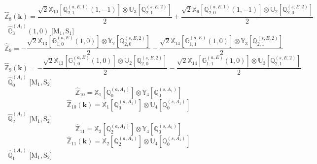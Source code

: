 \documentclass[fleqn,10pt,landscape]{article}
\begin{document}
\begin{itemize}
\begin{dmath*}
\end{dmath*}
\begin{dmath*}
\hat{\mathbb{Z}}_{8}(\bm{k})=\frac{\sqrt{2} \mathbb{X}_{10}[\mathbb{Q}_{2,1}^{(a,E,1)}(1,-1)] \otimes\mathbb{U}_{3}[\mathbb{Q}_{2,1}^{(s,E,2)}]}{2} + \frac{\sqrt{2} \mathbb{X}_{9}[\mathbb{Q}_{2,0}^{(a,E,1)}(1,-1)] \otimes\mathbb{U}_{2}[\mathbb{Q}_{2,0}^{(s,E,2)}]}{2}
\end{dmath*}
\vspace{4mm}
\noindent {} $\,\,\,\hat{\mathbb{G}}_{3}^{(A_{1})}(1,0)$ [M$_{1}$,\,S$_{1}$]
\begin{dmath*}
\hat{\mathbb{Z}}_{9}=- \frac{\sqrt{2} \mathbb{X}_{13}[\mathbb{G}_{1,0}^{(a,E)}(1,0)] \otimes\mathbb{Y}_{2}[\mathbb{Q}_{2,0}^{(s,E,2)}]}{2} - \frac{\sqrt{2} \mathbb{X}_{14}[\mathbb{G}_{1,1}^{(a,E)}(1,0)] \otimes\mathbb{Y}_{3}[\mathbb{Q}_{2,1}^{(s,E,2)}]}{2}
\end{dmath*}
\begin{dmath*}
\hat{\mathbb{Z}}_{9}(\bm{k})=- \frac{\sqrt{2} \mathbb{X}_{13}[\mathbb{G}_{1,0}^{(a,E)}(1,0)] \otimes\mathbb{U}_{2}[\mathbb{Q}_{2,0}^{(s,E,2)}]}{2} - \frac{\sqrt{2} \mathbb{X}_{14}[\mathbb{G}_{1,1}^{(a,E)}(1,0)] \otimes\mathbb{U}_{3}[\mathbb{Q}_{2,1}^{(s,E,2)}]}{2}
\end{dmath*}
\vspace{4mm}
\noindent {} $\,\,\,\hat{\mathbb{Q}}_{0}^{(A_{1})}$ [M$_{1}$,\,S$_{2}$]
\begin{dmath*}
\hat{\mathbb{Z}}_{10}=\mathbb{X}_{1}[\mathbb{Q}_{0}^{(a,A_{1})}] \otimes\mathbb{Y}_{4}[\mathbb{Q}_{0}^{(s,A_{1})}]
\end{dmath*}
\begin{dmath*}
\hat{\mathbb{Z}}_{10}(\bm{k})=\mathbb{X}_{1}[\mathbb{Q}_{0}^{(a,A_{1})}] \otimes\mathbb{U}_{4}[\mathbb{Q}_{0}^{(s,A_{1})}]
\end{dmath*}
\vspace{4mm}
\noindent {} $\,\,\,\hat{\mathbb{Q}}_{2}^{(A_{1})}$ [M$_{1}$,\,S$_{2}$]
\begin{dmath*}
\hat{\mathbb{Z}}_{11}=\mathbb{X}_{2}[\mathbb{Q}_{2}^{(a,A_{1})}] \otimes\mathbb{Y}_{4}[\mathbb{Q}_{0}^{(s,A_{1})}]
\end{dmath*}
\begin{dmath*}
\hat{\mathbb{Z}}_{11}(\bm{k})=\mathbb{X}_{2}[\mathbb{Q}_{2}^{(a,A_{1})}] \otimes\mathbb{U}_{4}[\mathbb{Q}_{0}^{(s,A_{1})}]
\end{dmath*}
\vspace{4mm}
\noindent {} $\,\,\,\hat{\mathbb{Q}}_{1}^{(A_{1})}$ [M$_{1}$,\,S$_{2}$]

\end{itemize}
\end{document}
